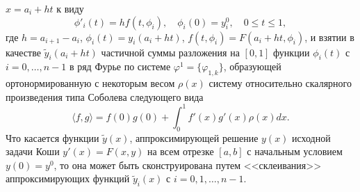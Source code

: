 \documentclass{article}
\numberwithin{equation}{section}
\theoremstyle{plain}
\theoremstyle{definition}
\begin{document}
\begin{fulltext}
   $x=a_i+ht$ к виду
   \begin{equation}\label{1.2}
\phi'_i(t)=hf(t,\phi_i), \quad \phi_i(0)=y_i^0,\quad 0\le t\le1,
\end{equation}
где $h=a_{i+1}-a_i$, $\phi_i(t)=y_i(a_i+ht)$, $f(t,\phi_i)=F(a_i+ht,\phi_i)$, и взятии в качестве  $\tilde y_i(a_i+ht)$   частичной суммы разложения на $[0,1]$ функции $\phi_i(t)$ с $i=0,\ldots,n-1$ в ряд Фурье по системе  $\varphi^1=\{\varphi_{1,k}\}$, образующей ортонормированную с некоторым весом $\rho(x)$ систему  относительно скалярного произведения типа Соболева следующего вида
  \begin{equation}\label{1.3}
\langle f,g\rangle=f(0)g(0)+\int_{0}^1f'(x)g'(x)\rho(x)dx.
\end{equation}
  Что касается функции $\tilde y(x)$, аппроксимирующей решение $y(x)$ исходной задачи Коши $y'(x)=F(x,y)$ на всем отрезке $[a,b]$  с начальным условием $y(0)=y^0$, то она может быть сконструирована  \cite{SharDagElec7,SharMagDagElec8} путем <<склеивания>> аппроксимирующих функций $\tilde y_i(x)$ с $i=0,1,\ldots, n-1$.


\end{fulltext}
\end{document}
